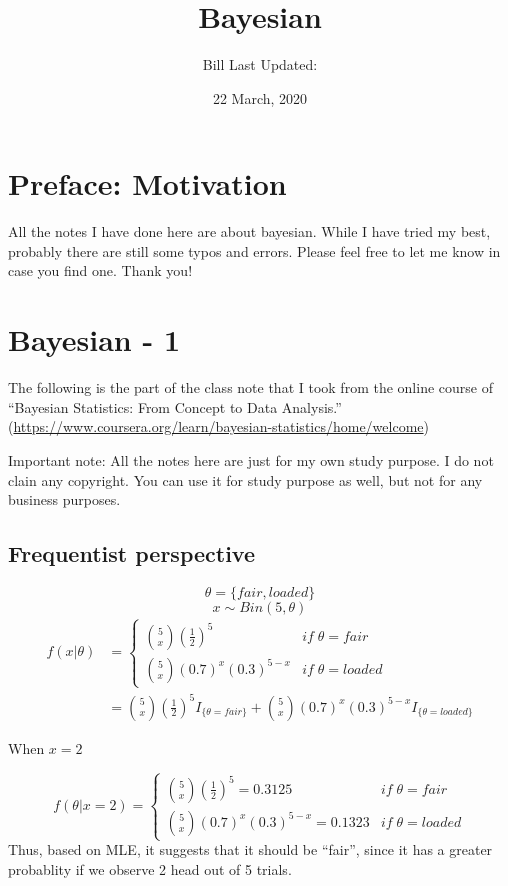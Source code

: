 \documentclass[
]{book}
\title{Bayesian}
\author{Bill Last Updated:}
\date{22 March, 2020}
\begin{document}
\frontmatter
\maketitle

{
\setcounter{tocdepth}{1}
\tableofcontents
}
\mainmatter
\hypertarget{my-section}{%
\chapter*{Preface: Motivation}\label{my-section}}

All the notes I have done here are about bayesian. While I have tried my best, probably there are still some typos and errors. Please feel free to let me know in case you find one. Thank you!

\hypertarget{bayesian---1}{%
\chapter{Bayesian - 1}\label{bayesian---1}}

The following is the part of the class note that I took from the online course of ``Bayesian Statistics: From Concept to Data Analysis.'' (\url{https://www.coursera.org/learn/bayesian-statistics/home/welcome})

Important note: All the notes here are just for my own study purpose. I do not clain any copyright. You can use it for study purpose as well, but not for any business purposes.

\hypertarget{frequentist-perspective}{%
\section{Frequentist perspective}\label{frequentist-perspective}}

\[\theta = \{ fair , loaded \}\]
\[x \sim Bin (5, \theta)\]
\[\begin{aligned} f(x|\theta) &=\begin{cases} \binom{5}{x} (\frac{1}{2})^5 & if \; \theta=fair  \\ \binom{5}{x} (0.7)^x(0.3)^{5-x} & if \;  \theta=loaded  \end{cases} \\ &= \binom{5}{x} (\frac{1}{2})^5 I_{\{\theta=fair \}}+\binom{5}{x} (0.7)^x(0.3)^{5-x}I_{\{\theta=loaded \}}\end{aligned}\]

When \(x=2\)

\[f(\theta | x=2)=\begin{cases} \binom{5}{x} (\frac{1}{2})^5 = 0.3125& if \; \theta=fair  \\ \binom{5}{x} (0.7)^x(0.3)^{5-x} = 0.1323& if \;  \theta=loaded  \end{cases}\]
Thus, based on MLE, it suggests that it should be ``fair'', since it has a greater probablity if we observe 2 head out of 5 trials.
\end{document}
